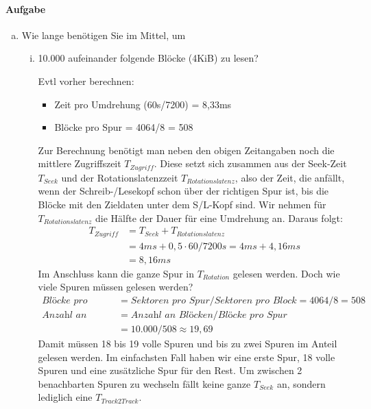 \paragraph{Aufgabe}
\begin{enumerate}[a)]
	\item Wie lange benötigen Sie im Mittel, um
	\label{ZugriffFestplattenDauern}

	\begin{enumerate}[i)]
		\item 10.000 aufeinander folgende Blöcke (4KiB) zu lesen?

\begin{solution}
	\begin{note}
		Evtl vorher berechnen:
		\begin{itemize}
			\item Zeit pro Umdrehung (60s/7200) = 8,33ms
			\item Blöcke pro Spur = 4064/8 = 508
		\end{itemize}
	\end{note}
	Zur Berechnung benötigt man neben den obigen Zeitangaben noch die mittlere Zugriffszeit $T_{Zugriff}$.
	Diese setzt sich zusammen aus der Seek-Zeit $T_{Seek}$ und der Rotationslatenzzeit $T_{Rotationslatenz}$, also der Zeit, die anfällt, wenn der Schreib-/Lesekopf schon über der richtigen Spur ist, bis die Blöcke mit den Zieldaten unter dem S/L-Kopf sind.
	Wir nehmen für $T_{Rotationslatenz}$ die Hälfte der Dauer für eine Umdrehung an.
	Daraus folgt:
	\begin{align*}
	T_{Zugriff} &= T_{Seek} + T_{Rotationslatenz}\\
	&= 4ms + 0,5\cdot 60/7200 s  = 4ms + 4,16ms\\
	&= 8,16ms
	\end{align*}
	Im Anschluss kann die ganze Spur in $T_{Rotation}$ gelesen werden.
	Doch wie viele Spuren müssen gelesen werden?
	\begin{align*}
		\textit{Blöcke pro Spur} &= \textit{Sektoren pro Spur} / \textit{Sektoren pro Block} = 4064/8 = 508\\ 
		\textit{Anzahl an Spuren} &= \textit{Anzahl an Blöcken} / \textit{Blöcke pro Spur}\\
		&= 10.000 / 508 \approx 19,69
	\end{align*}
	Damit müssen 18 bis 19 volle Spuren und bis zu zwei Spuren im Anteil gelesen werden.
	Im einfachsten Fall haben wir eine erste Spur, 18 volle Spuren und eine zusätzliche Spur für den Rest.
	Um zwischen 2 benachbarten Spuren zu wechseln fällt keine ganze $T_{Seek}$ an, sondern lediglich eine $T_{Track2Track}$.

\end{solution}
\end{enumerate}
\end{enumerate}
